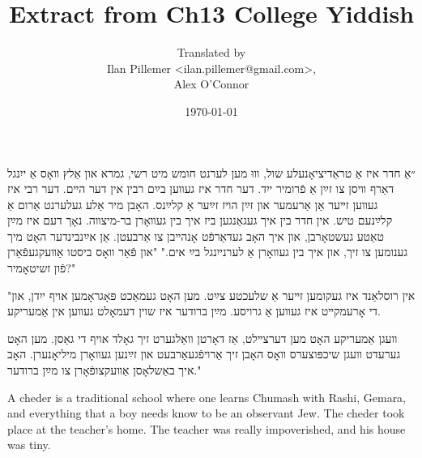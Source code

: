 \documentclass{article}
\begin{document}
\renewcommand{\abstractname}{\vspace{-\baselineskip}}
\title{Extract from Ch13 College Yiddish}
\author{Translated by \\ Ilan Pillemer <ilan.pillemer@gmail.com>, \\ Alex O'Connor }
\date{\today}

\maketitle
{}
\newline
\begin{pairs}

\begin{Rightside}
\begin{RTL}
\begin{hebrew}
\beginnumbering


\pstart
״אַ חדר איז אַ טראַדיציאָנעלע שול, װוּ מען לערנט חומש מיט רשי, גמרא און אַלץ װאָס אַ ייִנגל דאַרף װיסן צו זײַן אַ פֿרומיר ייִד.
דער חדר איז געװען בײַם רבין אין דער הײם. דער רבי איז געװען זײער אַן אַרעמער און זײַן הויז זײַער אַ קלײַנס. האָבן מיר אַלע געלערנט אַרום אַ קלײַנעם טיש. אין חדר בין איך געגאַנגען ביז איך בין געװאָרן בר-מיצװה.
 נאָך דעם איז מײַן טאַטע געשטאָרבן, און איך האָב געדאַרפֿט אָנהײבן צו אַרבעטן. אַן אײַנבינדער האָט מיך גענומען צו זיך, און איך בין געװאָרן אַ לערנייִנגל בײַ אים."
\pend
\pstart
"און פֿאַר װאָס ביסטו אַװעקגעפֿאַרן פֿון זשיטאָמיר?"

\pend
\pstart
"אין רוסלאַנד איז געקומען זײער אַ שלעכטע צײַט. מען האָט געמאַכט פּאָגראָמען אויף ייִדן, און די אָרעמקײט איז געװען אַ גרויסע.
מײַן ברודער איז שוין דעמאָלט געװען אין אַמעריקע.

 װעגן אַמעריקע האָט מען דערצײלט, אַז דאָרטן װאַלגערט זיך גאָלד אויף די גאַסן.
מען האָט גערעדט װעגן שיכפּוצערס װאָס האָבן זיך אַרויפֿגעאַרבעט און זײַנען געװאָרן מיליאָנערן. האָב איך באַשלאָסן אַװעקצופֿאָרן צו מײַן ברודער."

\pend
\endnumbering
\end{hebrew}
\end{RTL}
\end{Rightside}




\begin{Leftside}
\begin{english}
\beginnumbering
\pstart
A cheder is a traditional school where one learns Chumash with Rashi, Gemara\footnotemark[1], and everything that a boy needs know to be an observant Jew.
The cheder took place at the teacher's home. The teacher was really impoverished, and his house was tiny\footnotemark[2].


\end{english}
\end{Leftside}
\end{pairs}
\end{document}
